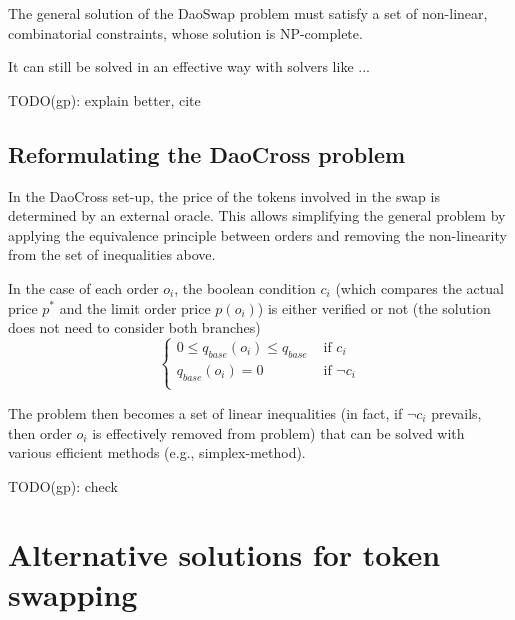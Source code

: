 \documentclass[11pt, reqno]{amsart}
\theoremstyle{definition}
\theoremstyle{remark}
\begin{document}
The general solution of the DaoSwap problem must satisfy a set of non-linear,
combinatorial constraints, whose solution is NP-complete.

It can still be solved in an effective way with solvers like ...

TODO(gp): explain better, cite

\subsection{Reformulating the DaoCross problem}
In the DaoCross set-up, the price of the tokens involved in the swap is
determined by an external oracle.
This allows simplifying the general problem by applying the equivalence
principle between orders and removing the non-linearity from the set of
inequalities above.

In the case of each order $o_i$, the boolean condition $c_i$ (which compares
the actual price $p^*$ and the limit order price $p(o_i)$) is either verified
or not (the solution does not need to consider both branches)
\begin{equation}
	\begin{cases}
        0 \le q_{base}(o_i) \le q_{base} & \text{ if } c_i                                   \\
        q_{base}(o_i) = 0 & \text{ if } \lnot c_i                                            \\
	\end{cases}
\end{equation}

The problem then becomes a set of linear inequalities (in fact, if $\lnot c_i$
prevails, then order $o_i$ is effectively removed from problem) that can be
solved with various efficient methods (e.g., simplex-method).

TODO(gp): check




\section{Alternative solutions for token swapping}
\end{document}
